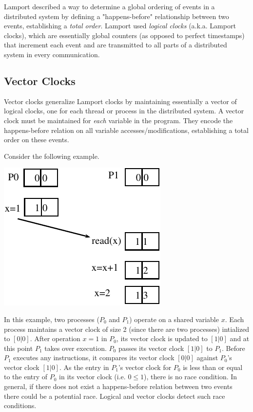 \documentclass[twoside]{article}
\begin{document}
Lamport described a way to determine a global ordering of events in a
distributed system by defining a "happens-before" relationship between two
events, establishing a \emph{total order}. Lamport used \emph{logical clocks}
(a.k.a. Lamport clocks), which are essentially global counters (as opposed to
perfect timestamps) that increment each event and are transmitted to all parts
of a distributed system in every communication.

\subsection{Vector Clocks}
Vector clocks generalize Lamport clocks by maintaining essentially a vector of
logical clocks, one for each thread or process in the distributed system. A
vector clock must be maintained for \emph{each} variable in the program. They
encode the happens-before relation on all variable accesses/modifications,
establishing a total order on these events.

Consider the following example.

\begin{center}
    \includegraphics[scale=.75]{example1.pdf}
\end{center}

In this example, two processes ($P_0$ and $P_1$) operate on a shared variable $x$.
Each process maintains a vector clock of size 2 (since there are two processes)
intialized to $[0|0]$. After operation $x=1$ in $P_0$, its vector clock is
updated to $[1|0]$ and at this point $P_1$ takes over execution. $P_0$ passes
its vector clock $[1|0]$ to $P_1$. Before $P_1$ executes any instructions, it
compares its vector clock $[0|0]$ against $P_0$'s vector clock $[1|0]$. As the
entry in $P_1$'s vector clock for $P_0$ is less than or equal to the entry of
$P_0$ in its vector clock (i.e. $0\le1$), there is no race condition. In
general, if there does not exist a happens-before relation between two events
there could be a potential race. Logical and vector clocks detect such race
conditions.
\end{document}
